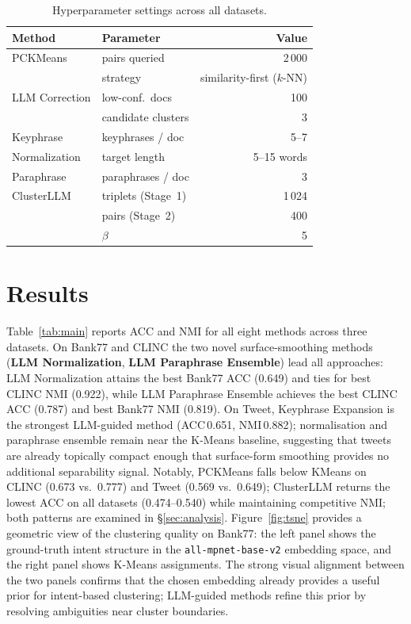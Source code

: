 \documentclass[10pt,twocolumn,a4paper]{article}
\begin{document}
\begin{table}[h]
\centering
\caption{Hyperparameter settings across all datasets.}
\label{tab:hparams}
\footnotesize
\setlength{\tabcolsep}{4pt}
\begin{tabular}{llr}
\toprule
Method & Parameter & Value \\
\midrule
PCKMeans       & pairs queried        & 2\,000 \\
               & strategy             & similarity-first ($k$-NN) \\
LLM Correction & low-conf.\ docs      & 100 \\
               & candidate clusters   & 3 \\
Keyphrase      & keyphrases / doc     & 5--7 \\
Normalization  & target length        & 5--15 words \\
Paraphrase     & paraphrases / doc    & 3 \\
ClusterLLM     & triplets (Stage~1)   & 1\,024 \\
               & pairs (Stage~2)      & 400 \\
               & $\beta$              & 5 \\
\bottomrule
\end{tabular}
\end{table}

\section{Results}
\label{sec:results}

Table~\ref{tab:main} reports ACC and NMI for all eight methods across three
datasets.
On Bank77 and CLINC the two novel surface-smoothing methods
(\textbf{LLM Normalization}, \textbf{LLM Paraphrase Ensemble}) lead all
approaches: LLM Normalization attains the best Bank77 ACC (0.649) and ties
for best CLINC NMI (0.922), while LLM Paraphrase Ensemble achieves the best
CLINC ACC (0.787) and best Bank77 NMI (0.819).
On Tweet, Keyphrase Expansion is the strongest LLM-guided method (ACC\,0.651,
NMI\,0.882); normalisation and paraphrase ensemble remain near the K-Means
baseline, suggesting that tweets are already topically compact enough that
surface-form smoothing provides no additional separability signal.
Notably, PCKMeans falls below KMeans on CLINC (0.673 vs.\ 0.777) and Tweet
(0.569 vs.\ 0.649); ClusterLLM returns the lowest ACC on all datasets
(0.474--0.540) while maintaining competitive NMI; both patterns are examined
in \S\ref{sec:analysis}.
Figure~\ref{fig:tsne} provides a geometric view of the clustering quality on
Bank77: the left panel shows the ground-truth intent structure in the
\texttt{all-mpnet-base-v2} embedding space, and the right panel shows K-Means
assignments.
The strong visual alignment between the two panels confirms that the chosen
embedding already provides a useful prior for intent-based clustering;
LLM-guided methods refine this prior by resolving ambiguities near cluster
boundaries.
\end{document}
